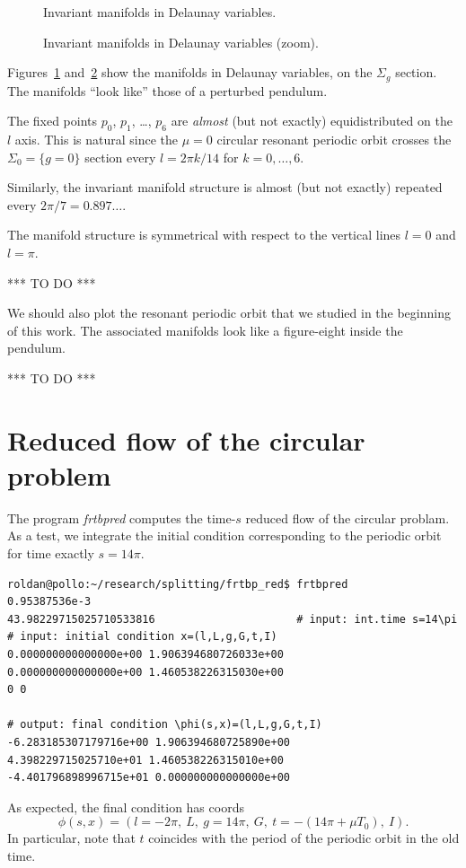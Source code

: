 \documentclass[a4paper]{amsart}
\theoremstyle{remark}
\begin{document}
\begin{figure}
\caption{Invariant manifolds in Delaunay variables.}
\label{fig:orbitpdel}
\end{figure}

\begin{figure}
\caption{Invariant manifolds in Delaunay variables (zoom).}
\label{fig:invmflddel}
\end{figure}

Figures~\ref{fig:orbitpdel} and~\ref{fig:invmflddel} show the
manifolds in Delaunay variables, on the $\Sigma_g$ section.
The manifolds ``look like'' those of a perturbed pendulum.

The fixed points $p_0$, $p_1$, \dots, $p_6$ are \emph{almost} (but not exactly)
equidistributed on the $l$ axis.
This is natural since the $\mu=0$ circular resonant periodic orbit
crosses the $\Sigma_0=\{g=0\}$ section every $l=2\pi k/14$ for
$k=0,\dots,6$.

Similarly, the invariant manifold structure is almost (but not
exactly) repeated every $2\pi/7=0.897\dots$.

The manifold structure is symmetrical with respect to the vertical
lines $l=0$ and $l=\pi$.

*** TO DO ***

We should also plot the resonant periodic orbit that we studied in the
beginning of this work. 
The associated manifolds look like a figure-eight inside the pendulum.

*** TO DO ***

\section{Reduced flow of the circular problem}

The program \emph{frtbpred} computes the time-$s$ reduced flow of
the circular problam. As a test, we integrate the initial condition
corresponding to the periodic orbit for time exactly $s=14\pi$.

\begin{verbatim}
roldan@pollo:~/research/splitting/frtbp_red$ frtbpred 
0.95387536e-3 
43.98229715025710533816                      # input: int.time s=14\pi
# input: initial condition x=(l,L,g,G,t,I)
0.000000000000000e+00 1.906394680726033e+00  
0.000000000000000e+00 1.460538226315030e+00
0 0

# output: final condition \phi(s,x)=(l,L,g,G,t,I)
-6.283185307179716e+00 1.906394680725890e+00 
4.398229715025710e+01 1.460538226315010e+00 
-4.401796898996715e+01 0.000000000000000e+00
\end{verbatim}
As expected, the final condition has coords 
\[ \phi(s,x) = (l=-2\pi,\ L,\ g=14\pi,\ G,\ t=-(14\pi+\mu T_0),\ I). \]
In particular, note that $t$ coincides with the period of the periodic
orbit in the old time.
\end{document}
